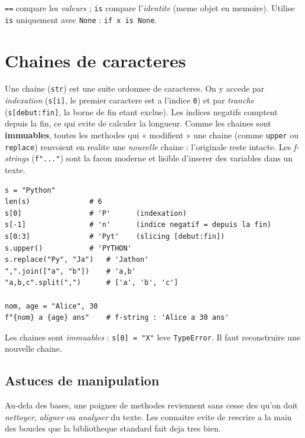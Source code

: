 \documentclass[11pt,a4paper]{article}
\begin{document}
\begin{piege}
\texttt{==} compare les \emph{valeurs} ; \texttt{is} compare l'\emph{identite}
(meme objet en memoire). Utilise \texttt{is} uniquement avec \texttt{None} :
\texttt{if x is None}.
\end{piege}

\section{Chaines de caracteres}
Une chaine (\texttt{str}) est une suite ordonnee de caracteres. On y accede par
\emph{indexation} (\texttt{s[i]}, le premier caractere est a l'indice \texttt{0})
et par \emph{tranche} (\texttt{s[debut:fin]}, la borne de fin etant exclue). Les
indices negatifs comptent depuis la fin, ce qui evite de calculer la longueur.
Comme les chaines sont \textbf{immuables}, toutes les methodes qui « modifient »
une chaine (comme \texttt{upper} ou \texttt{replace}) renvoient en realite une
\emph{nouvelle} chaine : l'originale reste intacte. Les \emph{f-strings}
(\texttt{f"..."}) sont la facon moderne et lisible d'inserer des variables dans
un texte.

\begin{lstlisting}
s = "Python"
len(s)              # 6
s[0]                # 'P'      (indexation)
s[-1]               # 'n'      (indice negatif = depuis la fin)
s[0:3]              # 'Pyt'    (slicing [debut:fin])
s.upper()           # 'PYTHON'
s.replace("Py", "Ja")   # 'Jathon'
",".join(["a", "b"])    # 'a,b'
"a,b,c".split(",")      # ['a', 'b', 'c']

nom, age = "Alice", 30
f"{nom} a {age} ans"    # f-string : 'Alice a 30 ans'
\end{lstlisting}

\begin{piege}
Les chaines sont \emph{immuables} : \texttt{s[0] = "X"} leve
\texttt{TypeError}. Il faut reconstruire une nouvelle chaine.
\end{piege}

\subsection{Astuces de manipulation}
Au-dela des bases, une poignee de methodes reviennent sans cesse des qu'on doit
\emph{nettoyer}, \emph{aligner} ou \emph{analyser} du texte. Les connaitre evite
de reecrire a la main des boucles que la bibliotheque standard fait deja tres
bien.
\end{document}
